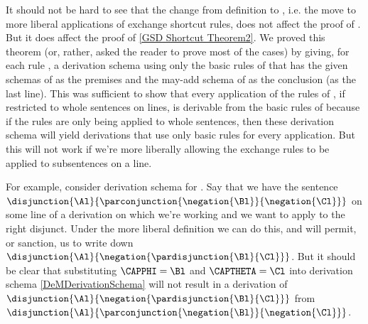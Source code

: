 It should not be hard to see that the change from definition  to , i.e. the move to more liberal applications of exchange shortcut rules, does not affect the proof of . 
But it does affect the proof of \ref{GSD Shortcut Theorem2}. 
We proved this theorem (or, rather, asked the reader to prove most of the cases) by giving, for each rule , a derivation schema using only the basic rules of \GSD{} that has the given schemas of  as the premises and the may-add schema of  as the conclusion (as the last line). 
This was sufficient to show that every application of the rules of \GSDP{}, if restricted to whole sentences on lines, is derivable from the basic rules of \GSD{} because if the rules are only being applied to whole sentences, then these derivation schema will yield derivations that use only basic rules for every application. 
But this will not work if we're more liberally allowing the exchange rules to be applied to subsentences on a line.

For example, consider derivation schema  for . 
Say that we have the sentence $\disjunction{\Al}{\parconjunction{\negation{\Bl}}{\negation{\Cl}}}$ on some line of a derivation on which we're working and we want to apply  to the right disjunct. 
Under the more liberal definition  we can do this, and  will permit, or sanction, us to write down $\disjunction{\Al}{\negation{\pardisjunction{\Bl}{\Cl}}}$. 
But it should be clear that substituting $\CAPPHI=\Bl$ and $\CAPTHETA=\Cl$ into derivation schema \ref{DeMDerivationSchema} will not result in a derivation of $\disjunction{\Al}{\negation{\pardisjunction{\Bl}{\Cl}}}$ from $\disjunction{\Al}{\parconjunction{\negation{\Bl}}{\negation{\Cl}}}$. 

